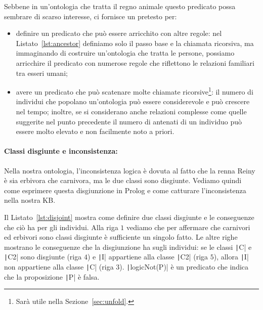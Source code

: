 \begin{listingenv}[h]
	\caption{Definizione di antenato}
	\label{lst:ancestor}
\end{listingenv}

Sebbene in un'ontologia che tratta il regno animale questo predicato possa sembrare di scarso interesse, ci fornisce un pretesto per:
\begin{itemize}
	\item definire un predicato che può essere arricchito con altre regole: nel Listato~\ref{lst:ancestor} definiamo solo il passo base e la chiamata ricorsiva, ma immaginando di costruire un'ontologia che tratta le persone, possiamo arricchire il predicato con numerose regole che riflettono le relazioni familiari tra esseri umani;
	\item avere un predicato che può scatenare molte chiamate ricorsive\footnote{Sarà utile nella Sezione~\ref{sec:unfold}.}: il numero di individui che popolano un'ontologia può essere considerevole e può crescere nel tempo; inoltre, se si considerano anche relazioni complesse \textemdash{}come quelle suggerite nel punto precedente\textemdash{} il numero di antenati di un individuo può essere molto elevato e non facilmente noto a priori.
\end{itemize}

\paragraph{Classi disgiunte e inconsistenza:} Nella nostra ontologia, l'inconsistenza logica è dovuta al fatto che la renna Reiny è sia erbivora che carnivora, ma le due classi sono disgiunte. Vediamo quindi come esprimere questa disgiunzione in Prolog e come catturare l'inconsistenza nella nostra KB.

Il Listato~\ref{lst:disjoint} mostra come definire due classi disgiunte e le conseguenze che ciò ha per gli individui. Alla riga $1$ vediamo che per affermare che carnivori ed erbivori sono classi disgiunte è sufficiente un singolo fatto. Le altre righe mostrano le conseguenze che la disgiunzione ha sugli individui: se le classi \texttt|C| e \texttt|C2| sono disgiunte (riga $4$) e \texttt|I| appartiene alla classe \texttt|C2| (riga $5$), allora \texttt|I| non appartiene alla classe \texttt|C| (riga $3$). \texttt|logicNot(P)| è un predicato che indica che la proposizione \texttt|P| è falsa. 

